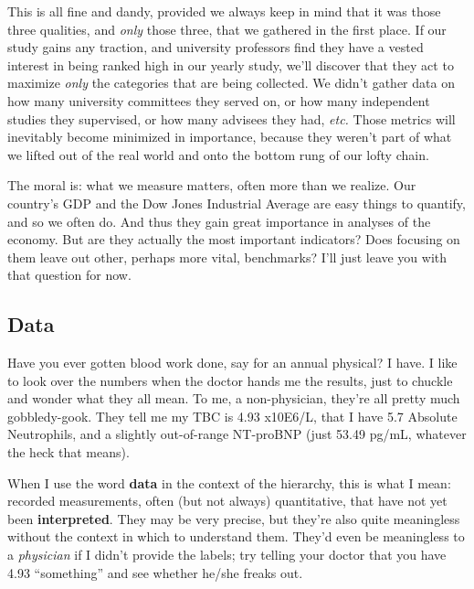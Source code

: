 This is all fine and dandy, provided we always keep in mind that it was those
three qualities, and \textit{only} those three, that we gathered in the first
place. If our study gains any traction, and university professors find they
have a vested interest in being ranked high in our yearly study, we'll discover
that they act to maximize \textit{only} the categories that are being
collected. We didn't gather data on how many university committees they served
on, or how many independent studies they supervised, or how many advisees they
had, \textit{etc.} Those metrics will inevitably become minimized in
importance, because they weren't part of what we lifted out of the real world
and onto the bottom rung of our lofty chain.


The moral is: what we measure matters, often more than we realize. Our
country's GDP and the Dow Jones Industrial Average are easy things to quantify,
and so we often do. And thus they gain great importance in analyses of the
economy. But are they actually the most important indicators? Does focusing on
them leave out other, perhaps more vital, benchmarks? I'll just leave you with
that question for now.

\subsection{Data}


Have you ever gotten blood work done, say for an annual physical? I have. I
like to look over the numbers when the doctor hands me the results, just to
chuckle and wonder what they all mean. To me, a non-physician, they're all
pretty much gobbledy-gook. They tell me my TBC is 4.93 x10E6/L, that
I have 5.7 Absolute Neutrophils, and a slightly out-of-range NT-proBNP (just
53.49 pg/mL, whatever the heck that means).

When I use the word \textbf{data} in the context of the hierarchy, this is what
I mean: recorded measurements, often (but not always) quantitative, that have
not yet been \textbf{interpreted}. They may be very precise, but they're also
quite meaningless without the context in which to understand them. They'd even
be meaningless to a \textit{physician} if I didn't provide the labels; try
telling your doctor that you have 4.93 ``something'' and see whether he/she
freaks out.

